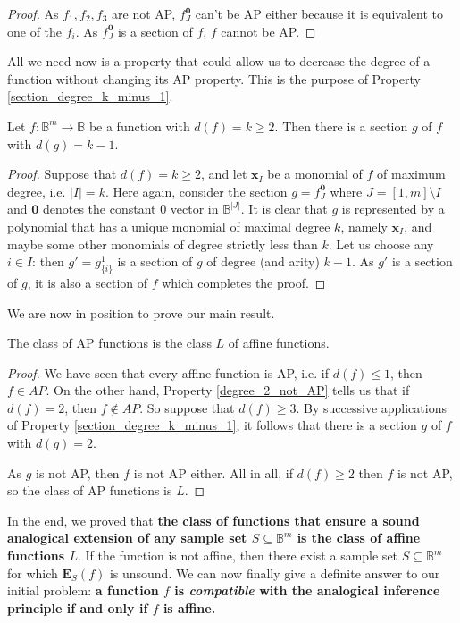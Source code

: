 \begin{proof}
  As $f_1, f_2, f_3$ are not AP, $f^{\mathbf{0}}_J$ can't be AP either because
  it is equivalent to one of the $f_i$. As $f^{\mathbf{0}}_J$ is a section of
  $f$, $f$ cannot be AP.
\end{proof}

All we need now is a property that could allow us to decrease the degree of a
function without changing its AP property. This is the purpose of
Property \ref{section_degree_k_minus_1}.

\begin{property}\label{section_degree_k_minus_1}
Let $f:\mathbb{B}^m\rightarrow \mathbb{B}$ be a function with
  $d(f)=k\geq 2$. Then there is a section $g$ of $f$ with $d(g)=k-1$.
\end{property}
\begin{proof}
Suppose that  $d(f)=k\geq 2$, and let $\mathbf{x}_I$ be a monomial of $f$ of
  maximum degree, i.e. $|I|=k$.  Here again, consider the section $g =
  f^{\mathbf{0}}_J$ where $J = [1, m] \setminus I$ and $\mathbf{0}$ denotes the
  constant $0$ vector in $\mathbb{B}^{|J|}$. It is clear that $g$ is
  represented by a  polynomial that has a unique monomial of maximal degree
  $k$, namely $\mathbf{x}_I$, and maybe some other monomials of degree strictly
  less than $k$.  Let us choose any $i \in I$: then $g' = g^1_{\{i\}}$ is a
  section of $g$ of degree (and arity) $k-1$. As $g'$ is a section of $g$, it
  is also a section of $f$ which completes the proof.
\end{proof}

We are now in position to prove our main result.

\begin{proposition}
  \label{PROPOS:AP_is_L}
The class of AP functions is the class $L$ of affine functions.
\end{proposition}
\begin{proof}
We have seen that every affine function is AP, i.e. if $d(f)\leq 1$, then $f\in
  AP$. On the other hand, Property \ref{degree_2_not_AP} tells us that if
  $d(f)=2$, then $f \notin AP$. So suppose that  $d(f)\geq 3$. By successive
  applications of Property \ref{section_degree_k_minus_1}, it follows that
  there is a section $g$ of $f$ with $d(g)=2$.

  As $g$ is not AP, then $f$ is not AP either. All in all, if $d(f) \geq 2$
  then $f$ is not AP, so the class of AP functions is $L$.
\end{proof}

In the end, we proved that {\bf the class of functions that ensure a sound
analogical extension of any sample set $S \subseteq \mathbb{B}^m$ is the class
of affine functions $L$}. If the function is not affine, then there exist a
sample set $S \subseteq \mathbb{B}^m$ for which $\mathbf{E}_S(f)$ is unsound.
We can now finally give a definite answer to our initial problem: \textbf{a
function $f$ is \textit{compatible} with the analogical inference principle if
and only if $f$ is affine.}

